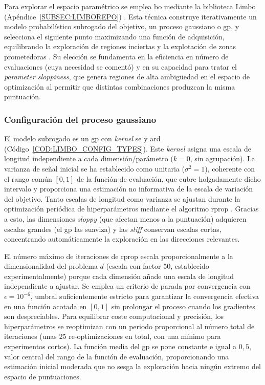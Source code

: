 Para explorar el espacio paramétrico se emplea \ac{bo} \cite{Shahriari2016} mediante la biblioteca Limbo (Apéndice~\ref{SUBSEC:LIMBOREPO}) \cite{Cully2018}. Esta técnica construye iterativamente un modelo probabilístico subrogado del objetivo, un proceso gaussiano o \ac{gp}, y selecciona el siguiente punto maximizando una función de adquisición, equilibrando la exploración de regiones inciertas y la explotación de zonas prometedoras \cite{Rasmussen2006}. Su elección se fundamenta en la eficiencia en número de evaluaciones (cuya necesidad se comentó) y en su capacidad para tratar el \textit{parameter sloppiness}, que genera regiones de alta ambigüedad en el espacio de optimización al permitir que distintas combinaciones produzcan la misma puntuación.

\subsubsection{Configuración del proceso gaussiano}

El modelo subrogado es un \ac{gp} con \textit{kernel} \ac{se} y \ac{ard} \cite{Rasmussen2006} (Código~\ref{COD:LIMBO_CONFIG_TYPES}). Este \textit{kernel} asigna una escala de longitud independiente a cada dimensión/parámetro ($k = 0$, sin agrupación). La varianza de señal inicial se ha establecido como unitaria ($\sigma^2 = 1$), coherente con el rango común $[0, 1]$ de la función de evaluación, que cubre holgadamente dicho intervalo y proporciona una estimación no informativa de la escala de variación del objetivo. Tanto escalas de longitud como varianza se ajustan durante la optimización periódica de hiperparámetros mediante el algoritmo \ac{rprop} \cite{Riedmiller1993}. Gracias a esto, las dimensiones \textit{sloppy} (que afectan menos a la puntuación) adquieren escalas grandes (el \ac{gp} las suaviza) y las \textit{stiff} conservan escalas cortas, concentrando automáticamente la exploración en las direcciones relevantes.

El número máximo de iteraciones de \ac{rprop} escala proporcionalmente a la dimensionalidad del problema $d$ (escala con factor 50, establecido experimentalmente) porque cada dimensión añade una escala de longitud independiente a ajustar. Se emplea un criterio de parada por convergencia con $\epsilon = 10^{-6}$, umbral suficientemente estricto para garantizar la convergencia efectiva en una función acotada en $[0, 1]$ sin prolongar el proceso cuando los gradientes son despreciables. Para equilibrar coste computacional y precisión, los hiperparámetros se reoptimizan con un periodo proporcional al número total de iteraciones (unas 25 re-optimizaciones en total, con una mínimo para experimentos cortos). La función media del \ac{gp} se pone constante e igual a $0{,}5$, valor central del rango de la función de evaluación, proporcionando una estimación inicial moderada que no sesga la exploración hacia ningún extremo del espacio de puntuaciones.

